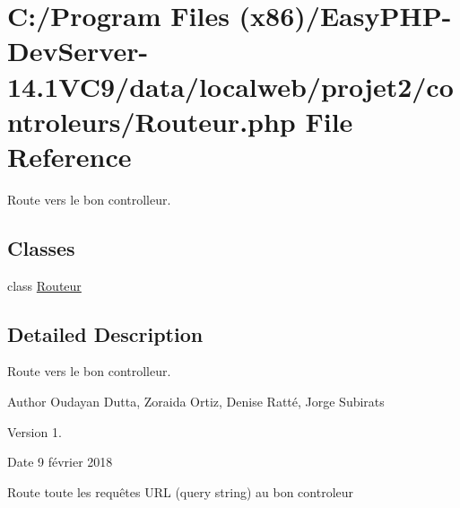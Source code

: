 \hypertarget{_routeur_8php}{}\section{C\+:/\+Program Files (x86)/\+Easy\+P\+H\+P-\/\+Dev\+Server-\/14.1\+V\+C9/data/localweb/projet2/controleurs/\+Routeur.php File Reference}
\label{_routeur_8php}


Route vers le bon controlleur.  


\subsection*{Classes}
\begin{DoxyCompactItemize}
\item 
class \hyperlink{class_routeur}{Routeur}
\end{DoxyCompactItemize}


\subsection{Detailed Description}
Route vers le bon controlleur. 

\begin{DoxyAuthor}{Author}
Oudayan Dutta, Zoraida Ortiz, Denise Ratté, Jorge Subirats 
\end{DoxyAuthor}
\begin{DoxyVersion}{Version}
1. 
\end{DoxyVersion}
\begin{DoxyDate}{Date}
9 février 2018
\end{DoxyDate}
Route toute les requêtes U\+RL (query string) au bon controleur 